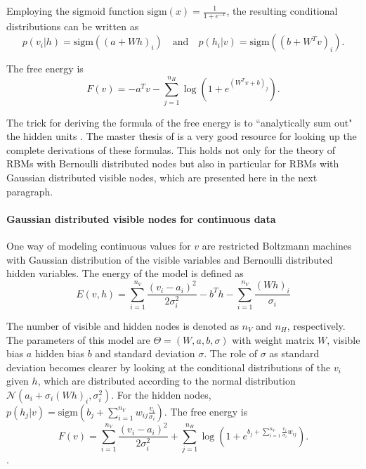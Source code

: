 \documentclass[12pt]{article}
\newcommand{\sigm}{\mathrm{sigm}}
\begin{document}
Employing the sigmoid function $\sigm(x) = \frac{1}{1+ e^{-x}}$, the resulting conditional distributions can be written as 
\[
p(v_i | h) = \sigm ((a + W h)_i)
 \quad \text{and}\quad 
p(h_i | v) = \sigm ((b + W^T v)_i).\]

The free energy is
\begin{equation}
F(v) = - a^T v - \sum_{j=1}^{n_H} \log \left (1 + e^{(W^T v + b)_j}\right).
\label{eqn:freeenergy_rbm}
\end{equation}

The trick for deriving the formula of the free energy is to ``analytically sum out" the hidden units \citep{sala2012anefficient}.
The master thesis of \cite{krizhevsky2009tinyimagesthesis} is a very good resource for looking up the complete derivations of these formulas. This holds not only for the theory of RBMs with Bernoulli distributed nodes but also in particular for RBMs with Gaussian distributed visible nodes, which are presented here in the next paragraph.

\paragraph{Gaussian distributed visible nodes for continuous data}
One way of modeling continuous values for $v$ are restricted Boltzmann machines with Gaussian distribution of the visible variables and Bernoulli distributed hidden variables. The energy of the model is defined as
\begin{equation}
   E(v,h) = \sum_{i=1}^{n_V}\frac{(v_i - a_i)^2}{2\sigma_i^2} - b^T h - \sum_{i=1}^{n_V} \frac{(Wh)_i}{\sigma_i}
   \label{eqn:energyformulagbrbm}
\end{equation}

The number of visible and hidden nodes is denoted as $n_V$ and $n_H$, respectively. The parameters of this model are $\Theta = (W, a, b, \sigma)$ with weight matrix $W$, visible bias $a$ hidden bias $b$ and standard deviation $\sigma$. The role of $\sigma$ as standard deviation becomes clearer by looking at the conditional distributions of the $v_i$ given $h$, which are distributed according to the normal distribution $\mathcal{N}(a_i + \sigma_i(Wh)_i, \sigma_i^2)$. For the hidden nodes, $p(h_j | v) = \sigm \left (b_j + \sum_{i=1}^{n_V} w_{ij} \frac{v_i}{\sigma_i} \right )$.
The free energy is
\begin{equation}
   F(v) = \sum_{i=1}^{n_V}\frac{(v_i - a_i)^2}{2\sigma_i^2} + \sum_{j=1}^{n_H} \log \left (1 + e^{b_j + \sum_{i=1}^{n_V} \frac{v_i}{\sigma_i} w_{ij}} \right).
\label{eqn:freenergy_gbrbm}
\end{equation}
\citep{krizhevsky2009tinyimages}.
\end{document}
